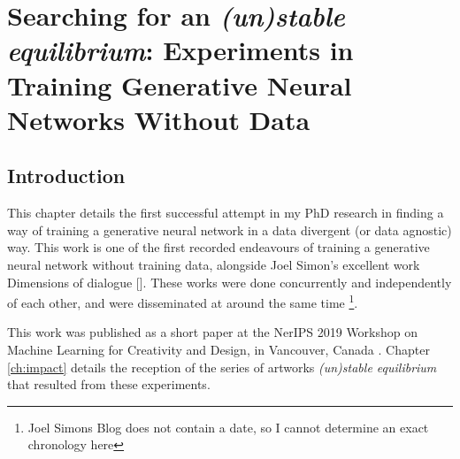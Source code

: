 \chapter{Searching for an \textit{(un)stable equilibrium}:
Experiments in Training Generative Neural Networks Without Data}
\label{ch:unstable_eq}

\section{Introduction}

This chapter details the first successful attempt in my PhD research in finding a way of training a generative neural network in a data divergent (or data agnostic) way. 
This work is one of the first recorded endeavours of training a generative neural network without training data, alongside Joel Simon’s excellent work Dimensions of dialogue [\citeyear{simon2019dimensions}]. 
These works were done concurrently and independently of each other, and were disseminated at around the same time \footnote{Joel Simons Blog does not contain a date, so I cannot determine an exact chronology here}. 

This work was published as a short paper at the NerIPS 2019 Workshop on Machine Learning for Creativity and Design, in Vancouver, Canada \citep{broad2019searching}. 
Chapter \ref{ch:impact} details the reception of the series of artworks \textit{(un)stable equilibrium} that resulted from these experiments. 

